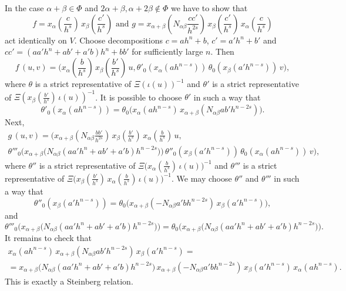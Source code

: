 \documentclass[oneside, 11pt]{amsart} \pdfoutput=1
\begin{document}
In the case $\alpha + \beta \in \Phi$ and $2\alpha + \beta, \alpha + 2\beta \notin \Phi$ we have to show that
$$\textstyle
f = x_\alpha(\frac c {h^s})\, x_\beta(\frac{c'}{h^s})
\text{ and }
g = x_{\alpha + \beta}(N_{\alpha \beta} \frac{cc'}{h^{2s}})\, x_\beta(\frac{c'}{h^s})\, x_\alpha(\frac c {h^s})
$$  %
act identically on $V$. Choose decompositions $c = ah^n + b$, $c' = a'h^n + b'$ and $cc' = (aa' h^n + ab' + a'b) h^n + bb'$ for sufficiently large $n$.
Then
$$\textstyle
f\,(u, v) = \bigl(x_\alpha(\frac b {h^s})\, x_\beta(\frac{b'}{h^s})\, u,
\theta'_0(x_\alpha(ah^{n - s}))\, \theta_0(x_\beta(a'h^{n - s}))\, v\bigr),
$$
where $\theta$ is a strict representative of $\Xi(\iota(u))^{-1}$ and $\theta'$ is a strict representative of $\Xi(x_\beta(\frac{b'}{h^s})\, \iota(u))^{-1}$. It is possible to choose $\theta'$ in such a way that
$$
\theta'_0(x_\alpha(ah^{n - s})) = \theta_0\bigl(x_\alpha(ah^{n - s})\, x_{\alpha + \beta}(N_{\alpha\beta} ab'h^{n - 2s})\bigr).
$$
Next, 
\begin{multline*}\textstyle
g\, (u, v) = \bigl(x_{\alpha+\beta}(N_{\alpha \beta} \frac{bb'}{h^{2s}})\, x_\beta(\frac{b'}{h^s})\, x_\alpha(\frac b {h^s})\, u,\\
\theta'''_0\bigl(x_{\alpha + \beta}\bigl(N_{\alpha \beta} (aa' h^n + ab' + a'b) h^{n - 2s}\bigr)\bigr)\, \theta''_0(x_\beta(a'h^{n-s}))\, \theta_0(x_\alpha(ah^{n - s}))\, v\bigr),
\end{multline*}
where $\theta''$ is a strict representative of $\Xi\bigl(x_\alpha(\frac b {h^s})\, \iota(u)\bigr)^{-1}$ and $\theta'''$ is a strict representative of $\Xi\bigl(x_\beta(\frac{b'}{h^s})\, x_\alpha(\frac b{h^s})\, \iota(u)\bigr)^{-1}$. We may choose $\theta''$ and $\theta'''$ in such a way that 
$$
\theta''_0(x_\beta(a' h^{n - s})) = \theta_0\bigl(x_{\alpha + \beta}(-N_{\alpha \beta} a'bh^{n - 2s})\, x_\beta(a'h^{n - s})\bigr),
$$
and
$$
\theta'''_0\bigl(x_{\alpha + \beta}\bigl(N_{\alpha \beta} (aa'h^n + ab' + a'b) h^{n - 2s}\bigr)\bigr) = \theta_0\bigl(x_{\alpha + \beta}\bigl(N_{\alpha \beta} (aa'h^n + ab' + a'b) h^{n - 2s}\bigr)\bigr).
$$
It remains to check that
\begin{multline*}
x_\alpha(ah^{n - s})\, x_{\alpha + \beta}(N_{\alpha \beta} ab' h^{n - 2s})\, x_\beta(a' h^{n - s}) =\\
= x_{\alpha + \beta}\bigl(N_{\alpha \beta} (aa' h^n + ab' + a'b) h^{n - 2s}\bigr)\, x_{\alpha + \beta}(-N_{\alpha\beta} a'bh^{n - 2s})\, x_\beta(a'h^{n - s})\, x_\alpha(ah^{n - s}).
\end{multline*}
This is exactly a Steinberg relation.
\end{document}
